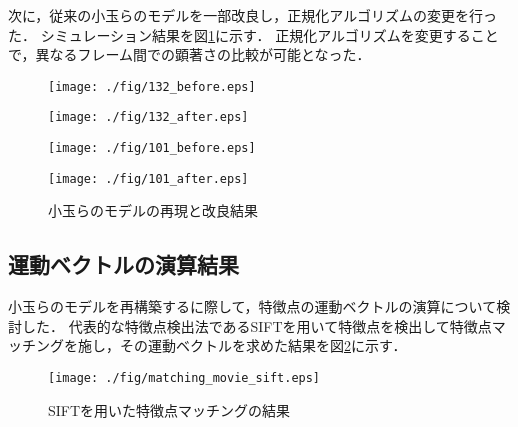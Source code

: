 \vspace{-2mm}

次に，従来の小玉らのモデルを一部改良し，正規化アルゴリズムの変更を行った．
シミュレーション結果を図\ref{fig:kodama_saliency}に示す．
正規化アルゴリズムを変更することで，異なるフレーム間での顕著さの比較が可能となった．
\vspace{-1.0mm}
\begin{figure}[h]
    \begin{minipage}[h]{0.5\hsize}
      \centering
      \texttt{[image: ./fig/132\_before.eps]}
      \label{fig:kodama_before}
    \end{minipage}
    \begin{minipage}[h]{0.5\hsize}
      \centering
      \texttt{[image: ./fig/132\_after.eps]}
      \label{fig:kodama_after}
    \end{minipage}
    \begin{minipage}[h]{0.5\hsize}
      \centering
      \vspace{-3.2mm}
      \texttt{[image: ./fig/101\_before.eps]}
      \label{fig:kodama_before}
    \end{minipage}
    \begin{minipage}[h]{0.5\hsize}
      \centering
      \vspace{-3.2mm}
      \texttt{[image: ./fig/101\_after.eps]}
      \label{fig:kodama_after}
    \end{minipage}
    \vspace*{0.8mm}
    \caption{小玉らのモデルの再現と改良結果}
    \label{fig:kodama_saliency}
\end{figure}

\subsection{運動ベクトルの演算結果}
小玉らのモデルを再構築するに際して，特徴点の運動ベクトルの演算について検討した．
代表的な特徴点検出法であるSIFT\cite{sift}を用いて特徴点を検出して特徴点マッチングを施し，その運動ベクトルを求めた結果を図\ref{fig:sift}に示す．

\vspace{-1.5mm}

\begin{figure}[h]
  \centering
  \texttt{[image: ./fig/matching\_movie\_sift.eps]}
  \centering
  \vspace{0.5mm}
  \caption{SIFTを用いた特徴点マッチングの結果}
  \label{fig:sift}
\end{figure}

